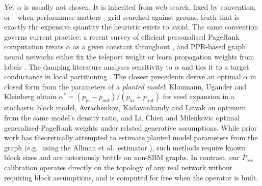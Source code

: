 \documentclass[11pt,a4paper]{article}
\newcommand{\Pescbar}{\bar{P}_{\mathrm{esc}}}
\begin{document}
Yet $\alpha$ is usually not chosen. It is inherited from web search, fixed by
convention, or---when performance matters---grid searched against ground truth
that is exactly the expensive quantity the heuristic exists to avoid. The same
convention governs current practice: a recent survey of efficient personalised
PageRank computation treats $\alpha$ as a given constant throughout
\cite{yang24}, and PPR-based graph neural networks either fix the teleport
weight or learn propagation weights from labels
\cite{gprgnn21,berberidis19,pirro25}. The damping literature analyses
sensitivity to $\alpha$ \cite{boldi05,bressan10} and ties it to a target
conductance in local partitioning \cite{acl06}. The closest precedents derive
an optimal $\alpha$ in closed form from the parameters of a \emph{planted
model}: Kloumann, Ugander and Kleinberg \cite{kloumann17} obtain
$\alpha^*=(p_{\mathrm{in}}-p_{\mathrm{out}})/(p_{\mathrm{in}}+p_{\mathrm{out}})$
for seed expansion in a stochastic block model, Avrachenkov, Kadavankandy and
Litvak \cite{avrachenkov18} an optimum from the same model's density ratio, and
Li, Chien and Milenkovic \cite{li19gpr} optimal generalized-PageRank weights
under related generative assumptions. While prior work has theoretically attempted
to estimate planted model parameters from the graph (e.g., using the Allman et
al.\ estimator \cite{allman11}), such methods require known block sizes and are
notoriously brittle on non-SBM graphs. In contrast, our $\Pescbar$ calibration
operates directly on the topology of any real network without requiring block
assumptions, and is computed for free when the operator is built.
\end{document}
